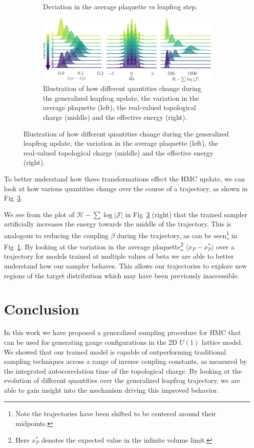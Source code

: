 \documentclass[a4paper,11pt]{article}
\begin{document}
\begin{figure}[t]
\begin{subfigure}[t]{0.49\textwidth}
        \caption{\label{fig:plaqsf_beta}Deviation in the average plaquette vs
        leapfrog step. }
    \end{subfigure}
    \begin{subfigure}[t]{\textwidth}
        \includegraphics[width=\textwidth]{assets/ridgeplots.pdf}
        \caption{\label{fig:ridgeplots}Illustration of how different quantities
            change during the generalized leapfrog update, the variation in the average
            plaquette (left), the real-valued topological charge (middle) and the effective
        energy (right).}
    \end{subfigure}
\end{figure}
%
To better understand how these transformations effect the HMC update, we can
look at how various quantities change over the course of a trajectory, as shown
in Fig~\ref{fig:ridgeplots}.
%

We see from the plot of \(\mathcal{H} - \sum \log | \mathcal{J} |\) in
Fig~\ref{fig:ridgeplots} (right) that the trained sampler artificially
increases the energy towards the middle of the trajectory.
%
This is analogous to reducing the coupling \(\beta\) during the trajectory, as
can be seen\footnote{%
    Note the trajectories have been shifted to be centered around their
    midpoints.
} in Fig~\ref{fig:plaqsf_beta}.
%
By looking at the variation in the average plaquette\footnote{%
    Here \(x^{\ast}_{P}\) denotes the expected value in the infinite volume limit.
} \(\langle x_{P} - x^{\ast}_{P}\rangle\) over a trajectory for models trained
at multiple values of beta we are able to better understand how our sampler
behaves.
%
This allows our trajectories to explore new regions of the target distribution
which may have been previously inaccessible.
%
\section{\label{sec:conclusion}Conclusion}
%
In this work we have proposed a generalized sampling procedure for HMC that can
be used for generating gauge configurations in the 2D \(U(1)\) lattice model.
%
We showed that our trained model is capable of outperforming traditional
sampling techniques across a range of inverse coupling constants, as measured
by the integrated autocorrelation time of the topological charge.
%
By looking at the evolution of different quantities over the generalized
leapfrog trajectory, we are able to gain insight into the mechanism driving
this improved behavior.
%
\end{document}
